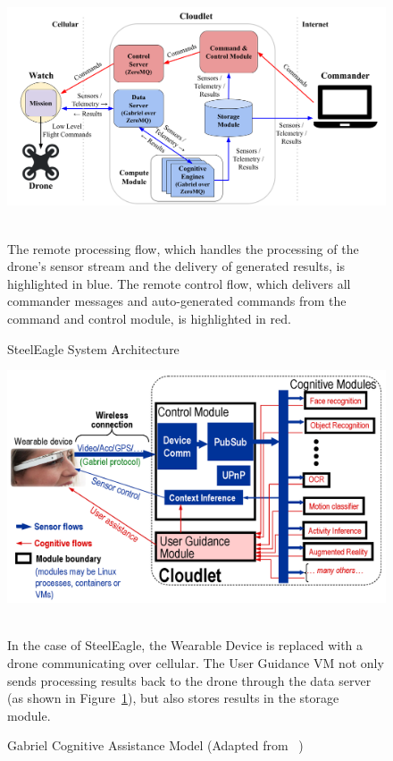 \begin{figure}
    \centering
    \includegraphics[width=0.9\linewidth]{chapter4/FIGS/arch.png}
    \begin{captext}
    \\[0.1cm]
    \small The remote processing flow, which handles the processing of the drone's sensor stream and the delivery of generated results, is highlighted in blue. The remote control flow, which delivers all commander messages and auto-generated commands from the command and control module, is highlighted in red.
    \end{captext}
    \caption{SteelEagle System Architecture}
    \label{fig:sys-arch}
\end{figure}

\begin{figure}
    \centering
    \includegraphics[width=0.8\linewidth]{chapter4/FIGS/gabriel.png}
    \begin{captext}
    \\[0.1cm]
    \small In the case of SteelEagle, the Wearable Device is replaced with a drone communicating over cellular. The User Guidance VM not only sends processing results back to the drone through the data server (as shown in Figure~\ref{fig:sys-arch}), but also stores results in the storage module.
    \end{captext}
    \caption{Gabriel Cognitive Assistance Model (Adapted from ~\cite{Ha2014})}
    \label{fig:gabriel-cognitive-assistance}
\end{figure}


